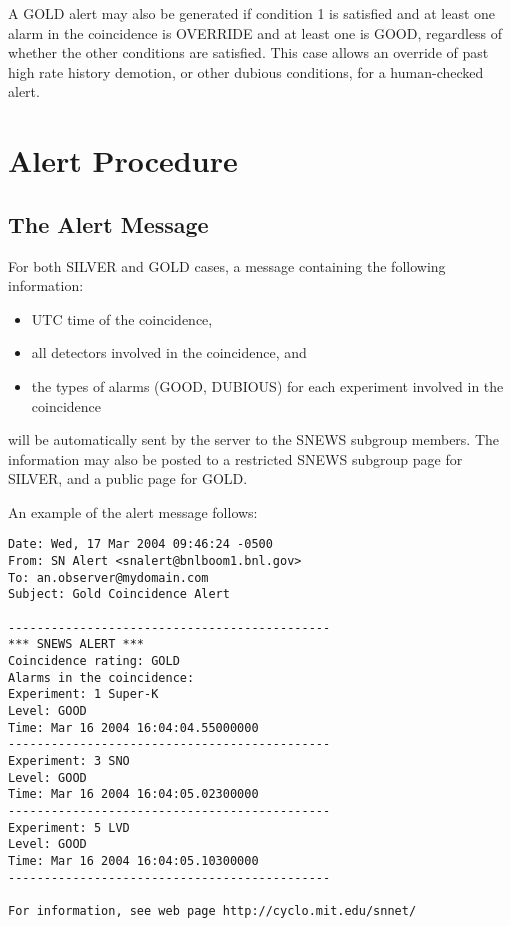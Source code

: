\documentclass{article}
\begin{document}
A GOLD alert may also be generated if condition 1 is satisfied and
at least one alarm in the coincidence is OVERRIDE and at least one
is GOOD, regardless of whether the other conditions
are satisfied. This case allows an override of past high rate history
demotion, or other dubious conditions,  for a human-checked alert.

\section{Alert Procedure}

\subsection{The Alert Message}

For both SILVER and GOLD cases, a message containing the following
information:

\begin{itemize}
\item UTC time of the coincidence,
\item all detectors involved in the coincidence, and
\item the types of alarms (GOOD, DUBIOUS) for each experiment involved
in the coincidence
\end{itemize}

will be automatically sent by the server to the SNEWS subgroup
members.   The information may also be posted to a restricted SNEWS
subgroup page for SILVER, and a public page for GOLD.

An example of the alert message follows:

\begin{verbatim}
Date: Wed, 17 Mar 2004 09:46:24 -0500
From: SN Alert <snalert@bnlboom1.bnl.gov>
To: an.observer@mydomain.com
Subject: Gold Coincidence Alert

---------------------------------------------
*** SNEWS ALERT ***
Coincidence rating: GOLD
Alarms in the coincidence:
Experiment: 1 Super-K
Level: GOOD
Time: Mar 16 2004 16:04:04.55000000
---------------------------------------------
Experiment: 3 SNO
Level: GOOD 
Time: Mar 16 2004 16:04:05.02300000
---------------------------------------------
Experiment: 5 LVD
Level: GOOD 
Time: Mar 16 2004 16:04:05.10300000
---------------------------------------------

For information, see web page http://cyclo.mit.edu/snnet/

\end{verbatim}
\end{document}
